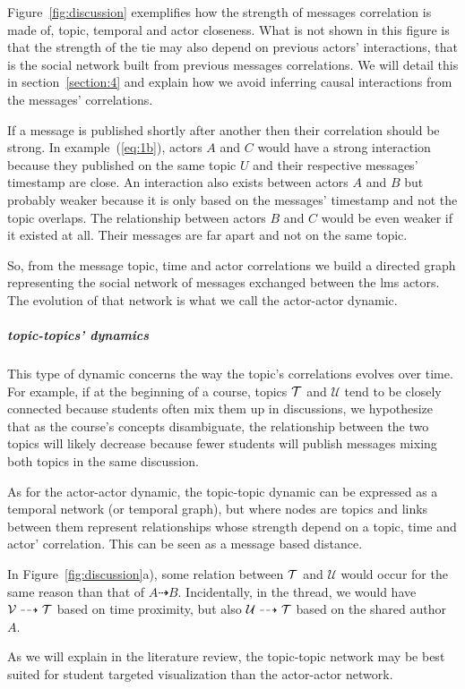 \documentclass[a4paper,twoside]{article}
\newcommand{\V}{\mathcal{V}}
\newcommand{\U}{\mathcal{U}}
\begin{document}
Figure~\ref{fig:discussion} exemplifies how the strength of messages correlation is made of, topic, temporal and actor closeness.  What is not shown in this figure is that the strength of the tie may also depend on previous actors' interactions, that is the social network built from previous messages correlations.
We will detail this in section~\ref{section:4} and explain how we avoid inferring causal interactions from the messages' correlations.

If a message is published shortly after another then their correlation should be strong.  In example~(\ref{eq:1b}), actors $A$ and $C$ would have a strong interaction because they published on the same topic $U$ and their respective messages' timestamp are close.  An interaction also exists between actors $A$ and $B$ but probably weaker because it is only based on the messages' timestamp and not the topic overlaps.  The relationship between actors $B$ and $C$ would be even weaker if it existed at all.  Their messages are far apart and not on the same topic.  

So, from the message topic, time and actor correlations we build a directed graph representing the social network of messages exchanged between the \gls{lms} actors.  The evolution of that network is what we call the actor-actor dynamic.

\subparagraph{topic-topics' dynamics} This type of dynamic concerns the way the topic's correlations evolves over time.  For example, if at the beginning of a course, topics $\mathcal{T}$ and $\U$ tend to be closely connected because students often mix them up in discussions, we hypothesize that as the course's concepts disambiguate, the relationship between the two topics will likely decrease because fewer students will publish messages mixing both topics in the same discussion.

As for the actor-actor dynamic, the topic-topic dynamic can be expressed as a temporal network (or temporal graph), but where nodes are topics and links between them represent relationships whose strength depend on a topic, time and actor' correlation.  This can be seen as a message based distance.

In Figure~\ref{fig:discussion}a), some relation between $\mathcal{T}$ and $\U$ would occur for the same reason than that of $A \dashrightarrow B$.  Incidentally, in the  thread, we would have $\V \dashrightarrow \T$ based on time proximity, but also $\U \dashrightarrow \T$ based on the shared author $A$.

As we will explain in the literature review, the topic-topic network may be best suited for student targeted visualization than the actor-actor network.
\end{document}
